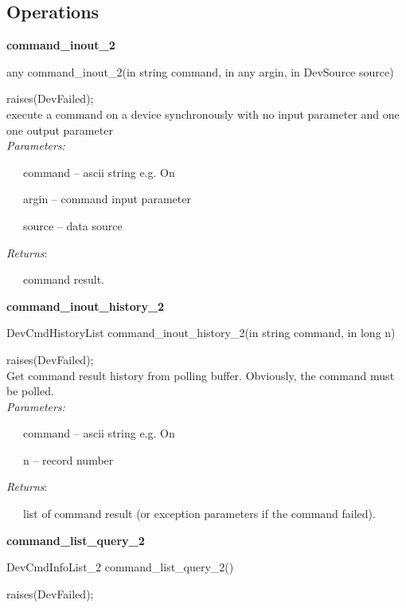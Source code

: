 \subsection{Operations}

\textbf{command\_inout\_2}

any command\_inout\_2(in string command, in any argin, in DevSource
source)

raises(DevFailed);\\

execute a command on a device synchronously with no input parameter
and one one output parameter\\

\emph{Parameters:}

~~~command – ascii string e.g. \textquotedbl{}On\textquotedbl{}

~~~argin – command input parameter

~~~source – data source

\emph{Returns}:

~~~command result.\\

\begin{flushleft}
\textbf{command\_inout\_history\_2}
\par\end{flushleft}

DevCmdHistoryList command\_inout\_history\_2(in string command, in
long n)

raises(DevFailed);\\

Get command result history from polling buffer. Obviously, the command
must be polled.\\

\emph{Parameters:}

~~~command – ascii string e.g. \textquotedbl{}On\textquotedbl{}

~~~n – record number

\emph{Returns}:

~~~list of command result (or exception parameters if the command
failed).\\

\begin{flushleft}
\textbf{command\_list\_query\_2}
\par\end{flushleft}

DevCmdInfoList\_2 command\_list\_query\_2()

raises(DevFailed);\\

